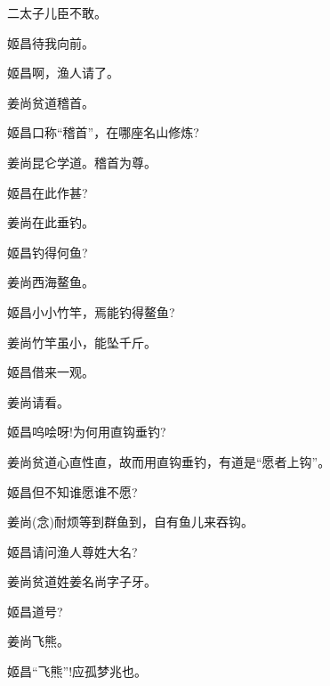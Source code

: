 {{\akai 二}太子\hspace{20pt}儿臣不敢。

姬昌\hspace{30pt}待我向前。

姬昌\hspace{30pt}啊，渔人请了。

姜尚\hspace{30pt}贫道稽首。

姬昌\hspace{30pt}口称``稽首''，在哪座名山修炼?

姜尚\hspace{30pt}昆仑学道。稽首为尊。

姬昌\hspace{30pt}在此作甚?

姜尚\hspace{30pt}在此垂钓。

姬昌\hspace{30pt}钓得何鱼?

姜尚\hspace{30pt}西海鳌鱼。

姬昌\hspace{30pt}小小竹竿，焉能钓得鳌鱼?

姜尚\hspace{30pt}竹竿虽小，能坠千斤。

姬昌\hspace{30pt}借来一观。

姜尚\hspace{30pt}请看。

姬昌\hspace{30pt}呜哙呀!为何用直钩垂钓?

姜尚\hspace{30pt}贫道心直性直，故而用直钩垂钓，有道是``愿者上钩''。

姬昌\hspace{30pt}但不知谁愿谁不愿?

姜尚\hspace{30pt}({\akai 念})耐烦等到群鱼到，自有鱼儿来吞钩。

姬昌\hspace{30pt}请问渔人尊姓大名?

姜尚\hspace{30pt}贫道姓姜名尚字子牙。

姬昌\hspace{30pt}道号?

姜尚\hspace{30pt}飞熊。

姬昌\hspace{30pt}``飞熊''!应孤梦兆也。

}
